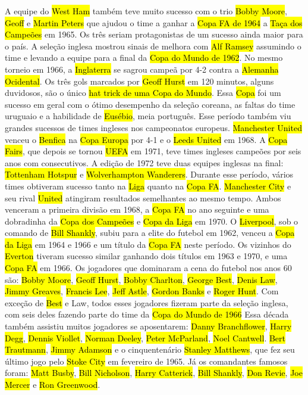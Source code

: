 \documentclass[a4paper,12pt]{article}
\begin{document}
A equipe do \hl{West Ham} também teve muito sucesso com o trio \hl{Bobby Moore}, \hl{Geoff} e \hl{Martin Peters} que ajudou o time a ganhar a \hl{Copa FA de 1964} a \hl{Taça dos Campeões} em 1965. Os três seriam protagonistas de um sucesso ainda maior para o país.
A seleção inglesa mostrou sinais de melhora com \hl{Alf Ramsey} assumindo o time e levando a equipe para a final da \hl{Copa do Mundo de 1962}. No mesmo torneio em 1966, a \hl{Inglaterra} se sagrou campeã por 4-2 contra a \hl{Alemanha Ocidental}. Os três gols marcados por \hl{Geoff Hurst} em 120 minutos, alguns duvidosos, são o único \hl{hat trick de uma Copa do Mundo}. Essa \hl{Copa} foi um sucesso em geral com o ótimo desempenho da seleção coreana, as faltas do time uruguaio e a habilidade de \hl{Eusébio}, meia português.
Esse período também viu grandes sucessos de times ingleses nos campeonatos europeus. \hl{Manchester United} venceu o \hl{Benfica} na \hl{Copa Europa} por 4-1 e o \hl{Leeds United} em 1968. A \hl{Copa Fairs}, que depois se tornou \hl{UEFA} em 1971, teve times ingleses campeões por seis anos com consecutivos. A edição de 1972 teve duas equipes inglesas na final: \hl{Tottenham Hotspur} e \hl{Wolverhampton Wanderers}.
Durante esse período, vários times obtiveram sucesso tanto na \hl{Liga} quanto na \hl{Copa FA}. \hl{Manchester City} e seu rival \hl{United} atingiram resultados semelhantes ao mesmo tempo. Ambos venceram a primeira divisão em 1968, a \hl{Copa FA} no ano seguinte e uma dobradinha da \hl{Copa dos Campeões} e \hl{Copa da Liga} em 1970. O \hl{Liverpool}, sob o comando de \hl{Bill Shankly}, subiu para a elite do futebol em 1962, venceu a \hl{Copa da Liga} em 1964 e 1966 e um título da \hl{Copa FA} neste período. Os vizinhos do \hl{Everton} tiveram sucesso similar ganhando dois títulos em 1963 e 1970, e uma \hl{Copa FA} em 1966.
Os jogadores que dominaram a cena do futebol nos anos 60 são: \hl{Bobby Moore}, \hl{Geoff Hurst}, \hl{Bobby Charlton}, \hl{George Best}, \hl{Denis Law}, \hl{Jimmy Greaves}, \hl{Francis Lee}, \hl{Jeff Astle}, \hl{Gordon Banks} e \hl{Roger Hunt}. Com exceção de \hl{Best} e Law, todos esses jogadores fizeram parte da seleção inglesa, com seis deles fazendo parte do time da \hl{Copa do Mundo de 1966}
Essa década também assistiu muitos jogadores se aposentarem: \hl{Danny Branchflower}, \hl{Harry Degg}, \hl{Dennis Viollet}, \hl{Norman Deeley}, \hl{Peter McParland}, \hl{Noel Cantwell}. \hl{Bert Trautmann}, \hl{Jimmy Adamson} e o cinquentenário \hl{Stanley Matthews}, que fez seu último jogo pelo \hl{Stoke City} em fevereiro de 1965. Já os comandantes famosos foram: \hl{Matt Busby}, \hl{Bill Nicholson}, \hl{Harry Catterick}, \hl{Bill Shankly}, \hl{Don Revie}, \hl{Joe Mercer} e \hl{Ron Greenwood}.
\end{document}

